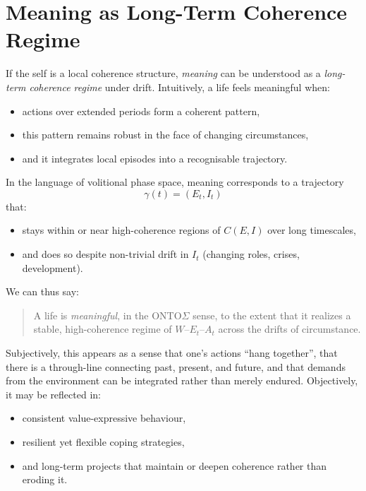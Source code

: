 \documentclass[12pt,a4paper]{report}
\newcommand{\Will}{W}
\newcommand{\Struct}{E}
\newcommand{\Act}{A}
\begin{document}
\section{Meaning as Long-Term Coherence Regime}

If the self is a local coherence structure, \emph{meaning} can be understood as a \emph{long-term coherence regime} under drift. Intuitively, a life feels meaningful when:

\begin{itemize}[leftmargin=2em]
    \item actions over extended periods form a coherent pattern,
    \item this pattern remains robust in the face of changing circumstances,
    \item and it integrates local episodes into a recognisable trajectory.
\end{itemize}

In the language of volitional phase space, meaning corresponds to a trajectory
\[
    \gamma(t) = (E_t, I_t)
\]
that:

\begin{itemize}[leftmargin=2em]
    \item stays within or near high-coherence regions of \(C(E, I)\) over long timescales,
    \item and does so despite non-trivial drift in \(I_t\) (changing roles, crises, development).
\end{itemize}

We can thus say:

\begin{quote}
A life is \emph{meaningful}, in the ONTO$\Sigma$ sense, to the extent that it realizes a stable, high-coherence regime of \(\Will\)–\(\Struct_t\)–\(\Act_t\) across the drifts of circumstance.
\end{quote}

Subjectively, this appears as a sense that one's actions ``hang together'', that there is a through-line connecting past, present, and future, and that demands from the environment can be integrated rather than merely endured. Objectively, it may be reflected in:

\begin{itemize}[leftmargin=2em]
    \item consistent value-expressive behaviour,
    \item resilient yet flexible coping strategies,
    \item and long-term projects that maintain or deepen coherence rather than eroding it.
\end{itemize}
\end{document}
